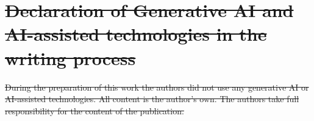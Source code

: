\documentclass[doc, floatsintext]{apa7}
\providecommand{\DIFdel}[1]{{\protect\color{red}\sout{#1}}}                      %
\providecommand{\DIFaddend}{} %
\providecommand{\DIFdelbegin}{} %
\providecommand{\DIFdelend}{} %
\newcommand{\DIFscaledelfig}{0.5}
\newlength{\DIFdelgraphicswidth} %
\newlength{\DIFdelgraphicsheight} %
\newcommand{\DIFdelincludegraphics}[2][]{%
\sbox{\DIFdelgraphicsbox}{\DIFOincludegraphics[#1]{#2}}%
\settoboxwidth{\DIFdelgraphicswidth}{\DIFdelgraphicsbox} %
\settoboxtotalheight{\DIFdelgraphicsheight}{\DIFdelgraphicsbox} %
\scalebox{\DIFscaledelfig}{%
\parbox[b]{\DIFdelgraphicswidth}{\usebox{\DIFdelgraphicsbox}\\[-\baselineskip] \rule{\DIFdelgraphicswidth}{0em}}\llap{\resizebox{\DIFdelgraphicswidth}{\DIFdelgraphicsheight}{%
\setlength{\unitlength}{\DIFdelgraphicswidth}%
\begin{picture}(1,1)%
\thicklines\linethickness{2pt} %
{\color[rgb]{1,0,0}\put(0,0){\framebox(1,1){}}}%
{\color[rgb]{1,0,0}\put(0,0){\line( 1,1){1}}}%
{\color[rgb]{1,0,0}\put(0,1){\line(1,-1){1}}}%
\end{picture}%
}\hspace*{3pt}}} %
} %
\DeclareRobustCommand{\DIFaddend}{\DIFOaddend \let\includegraphics\DIFOincludegraphics} %
\DeclareRobustCommand{\DIFdelbegin}{\DIFOdelbegin \let\includegraphics\DIFdelincludegraphics} %
\DeclareRobustCommand{\DIFdelend}{\DIFOaddend \let\includegraphics\DIFOincludegraphics} %
\begin{document}
\DIFaddend %
% 
\DIFdelbegin \section{\DIFdel{Declaration of Generative AI and AI-assisted
technologies in the writing process}}
\addtocounter{section}{-1}%

\DIFdel{During the preparation of this work the authors did not use
any generative AI or AI-assisted technologies.  All content
is the author's own.  The authors take full responsibility
for the content of the publication.
}\DIFdelend %







\printbibliography
\end{document}
